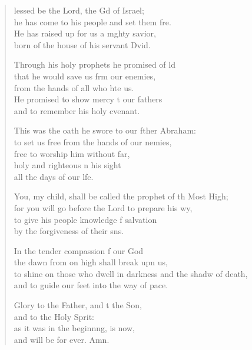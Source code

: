 \begin{verse}
  \begin{patverse}
lessed be the Lord, the Gd of Israel;\Med\\
he has come to his people and set them fre.\\
He has raised up for us a m\pointup{\i}ghty savior,\Med\\
born of the house of his servant Dvid.

Through his holy prophets he promised of ld\Flex\\
that he would save us frm our enemies,\Med\\
from the hands of all who hte us.\\
He promised to show mercy t our fathers\Med\\
and to remember his holy cvenant.

This was the oath he swore to our fther Abraham:\Med\\
to set us free from the hands of our nemies,\\
free to worship him without far,\Flex\\
holy and righteous \pointup{\i}n his sight\Med\\
all the days of our l\pointup{\i}fe.

You, my child, shall be called the prophet of th Most High;\Med\\
for you will go before the Lord to prepare his wy,\\
to give his people knowledge f salvation\Med\\
by the forgiveness of their s\pointup{\i}ns.

In the tender compassion f our God\Med\\
the dawn from on high shall break upn us,\\
to shine on those who dwell in darkness and the shadw of death,\Med\\
and to guide our feet into the way of pace.

Glory to the Father, and t the Son,\Med\\
and to the Holy Sp\pointup{\i}rit:\\
as it was in the beginn\pointup{\i}ng, is now,\Med\\
and will be for ever. Amn.
  \end{patverse}
  \end{verse}
